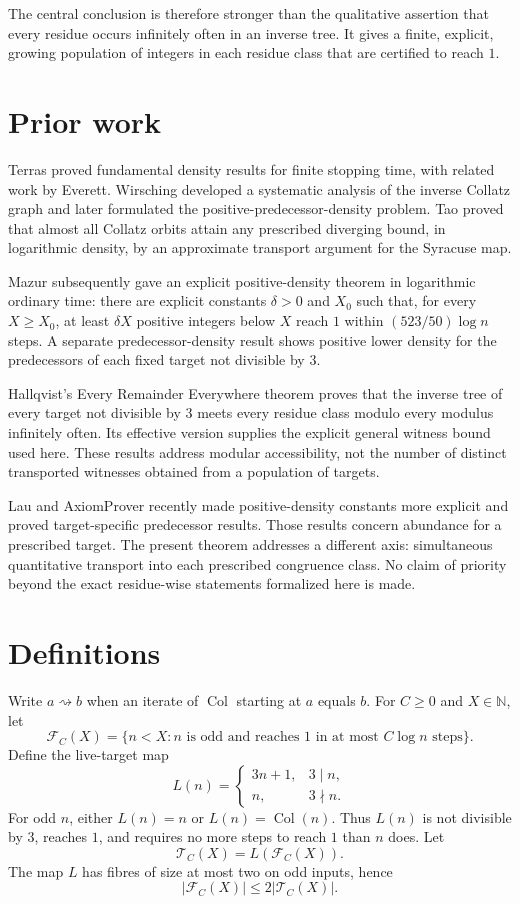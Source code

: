 \documentclass[11pt]{article}
\theoremstyle{definition}
\theoremstyle{remark}
\newcommand{\N}{\mathbb N}
\newcommand{\Col}{\operatorname{Col}}
\newcommand{\Reach}{\rightsquigarrow}
\newcommand{\card}[1]{\lvert #1\rvert}
\begin{document}
The central conclusion is therefore stronger than the qualitative assertion
that every residue occurs infinitely often in an inverse tree.  It gives a
finite, explicit, growing population of integers in each residue class that
are certified to reach $1$.

\section{Prior work}
Terras proved fundamental density results for finite stopping time, with
related work by Everett.  Wirsching developed a systematic analysis of the
inverse Collatz graph and later formulated the positive-predecessor-density
problem.  Tao proved that almost all Collatz orbits attain any prescribed
diverging bound, in logarithmic density, by an approximate transport argument
for the Syracuse map.

Mazur subsequently gave an explicit positive-density theorem in logarithmic
ordinary time: there are explicit constants $\delta>0$ and $X_0$ such that,
for every $X\ge X_0$, at least $\delta X$ positive integers below $X$ reach
$1$ within $(523/50)\log n$ steps.  A separate predecessor-density result
shows positive lower density for the predecessors of each fixed target not
divisible by $3$.

Hallqvist's Every Remainder Everywhere theorem proves that the inverse tree of
every target not divisible by $3$ meets every residue class modulo every
modulus infinitely often.  Its effective version supplies the explicit
general witness bound used here.  These results address modular accessibility,
not the number of distinct transported witnesses obtained from a population
of targets.

Lau and AxiomProver recently made positive-density constants more explicit and
proved target-specific predecessor results.  Those results concern abundance
for a prescribed target.  The present theorem addresses a different axis:
simultaneous quantitative transport into each prescribed congruence class.
No claim of priority beyond the exact residue-wise statements formalized here
is made.

\section{Definitions}
Write $a\Reach b$ when an iterate of $\Col$ starting at $a$ equals $b$.
For $C\ge0$ and $X\in\N$, let
\[
 \mathcal F_C(X)=\{n<X:n\text{ is odd and reaches }1
       \text{ in at most }C\log n\text{ steps}\}.
\]
Define the live-target map
\[
 L(n)=\begin{cases}3n+1,&3\mid n,\\n,&3\nmid n.\end{cases}
\]
For odd $n$, either $L(n)=n$ or $L(n)=\Col(n)$.  Thus $L(n)$ is not divisible
by $3$, reaches $1$, and requires no more steps to reach $1$ than $n$ does.
Let
\[
 \mathcal T_C(X)=L(\mathcal F_C(X)).
\]
The map $L$ has fibres of size at most two on odd inputs, hence
\begin{equation}\label{eq:live-count}
 \card{\mathcal F_C(X)}\le2\card{\mathcal T_C(X)}.
\end{equation}
\end{document}
